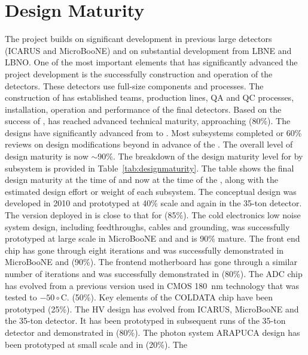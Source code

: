 \section{ Design Maturity}

The  project builds on significant development in previous
large  detectors (ICARUS and MicroBooNE) and on
substantial development from LBNE and LBNO. One of the most important
elements that has significantly advanced the project development is
the successfully construction and operation of the 
detectors. These detectors use full-size  components and
processes. The construction of  has established
teams, production lines, QA and QC processes, installation, operation
and performance of the final  detectors. Based on the
success of ,  has reached advanced technical
maturity, approaching (80\%). The designs have significantly advanced
from  to . Most subsystems completed
 or 60\% reviews on design modifications beyond
 in advance of the . The overall level of
design maturity is now $\sim$90\%. The breakdown of the design maturity
level for  by subsystem is provided in
Table~\ref{tab:designmaturity}. The table shows the final 
design maturity at the time of  and now at the time
of the , along with the estimated design effort or weight
of each subsystem. The  conceptual design was developed in
2010 and prototyped at 40\% scale and again in the 35-ton detector. The version
deployed in  is close to that for  (85\%). The
cold electronics low noise system design, including feedthroughs,
cables and grounding, was successfully prototyped at large scale in
MicroBooNE and  and is 90\% mature. The front end chip has
gone through eight iterations and was successfully demonstrated in
MicroBooNE and  (90\%). The frontend motherboard has gone
through a similar number of iterations and was successfully
demonstrated in  (80\%). The ADC chip has evolved from a
previous version used in CMOS 180~nm technology that was tested to $-50\circ$C. (50\%). Key
elements of the COLDATA chip have been prototyped (25\%). The HV
design has evolved from ICARUS, MicroBooNE and the 35-ton detector.  It
has been prototyped in subsequent runs of the 35-ton detector and
demonstrated in  (80\%). The photon system ARAPUCA design
has been prototyped at small scale and in  (20\%). The
